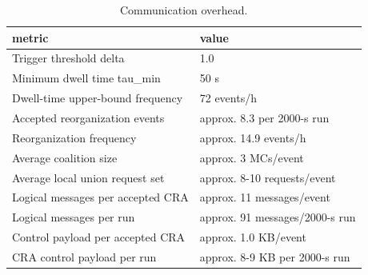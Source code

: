 \begin{table}[t]
\centering
\caption{Communication overhead.}
\begin{tabular}{ll}
\hline
metric & value \\
\hline
Trigger threshold delta & 1.0 \\
Minimum dwell time tau\_min & 50 s \\
Dwell-time upper-bound frequency & 72 events/h \\
Accepted reorganization events & approx. 8.3 per 2000-s run \\
Reorganization frequency & approx. 14.9 events/h \\
Average coalition size & approx. 3 MCs/event \\
Average local union request set & approx. 8-10 requests/event \\
Logical messages per accepted CRA & approx. 11 messages/event \\
Logical messages per run & approx. 91 messages/2000-s run \\
Control payload per accepted CRA & approx. 1.0 KB/event \\
CRA control payload per run & approx. 8-9 KB per 2000-s run \\
\hline
\end{tabular}
\end{table}
